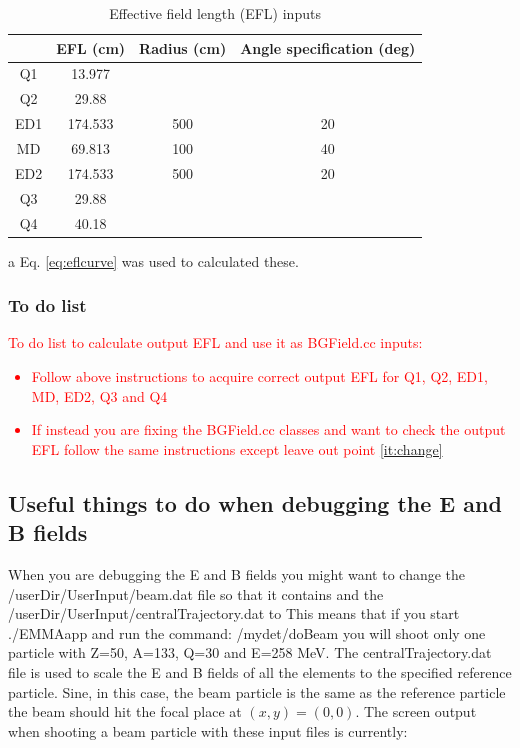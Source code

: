 \documentclass[letter,11pt]{article}
\newcommand{\filefont}[1]{{\scriptsize\ttfamily\selectfont #1}\xspace}
\begin{document}
\begin{table}
\caption{Effective field length (EFL) inputs}\label{tab:desiredefl}
\centering
\begin{threeparttable}
\begin{tabular}{cccc}
\hline
	&EFL (cm)	&Radius (cm)	&Angle specification (deg)	\\
\hline
Q1	&13.977		&&\\
Q2	&29.88		&&\\
ED1	&174.533\tnote{a}	&500			&20\\
MD	&69.813\tnote{a}	&100			&40\\
ED2	&174.533\tnote{a}	&500			&20\\
Q3	&29.88		&&\\
Q4	&40.18		&&\\
\end{tabular}
     \begin{tablenotes}
       \item[a] {\small Eq. \ref{eq:eflcurve} was used to calculated these.}
     \end{tablenotes}
\end{threeparttable}
\end{table}

\subsubsection{To do list}

\textcolor{red}{To do list to calculate output EFL and use it as BGField.cc inputs:
\begin{itemize}
\item Follow above instructions to acquire correct output EFL for Q1, Q2, ED1, MD, ED2, Q3 and Q4
\item If instead you are fixing the BGField.cc classes and want to check the output EFL follow the same instructions except leave out point \ref{it:change}
\end{itemize}
}


\subsection{Useful things to do when debugging the E and B fields}\label{sec:useful}

When you are debugging the E and B fields you might want to change the /userDir/UserInput/beam.dat file so that it contains
{\footnotesize }
and the /userDir/UserInput/centralTrajectory.dat to
{\footnotesize }
This means that if you start \filefont{./EMMAapp} and run the command:
\filefont{/mydet/doBeam}
you will shoot only one particle with Z=50, A=133, Q=30 and E=258 MeV. The centralTrajectory.dat file is used to scale the E and B fields of all the elements to the specified reference particle. Sine, in this case, the beam particle is the same as the reference particle the beam should hit the focal place at $(x,y)=(0,0)$. The screen output when shooting a beam particle with these input files is currently:\\
\end{document}
